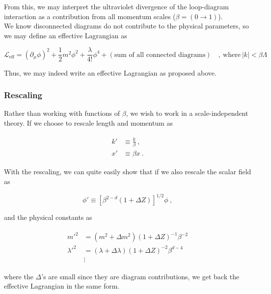 \documentclass[10pt,twoside]{report}
\begin{document}
	From this, we may interpret the ultraviolet divergence of the loop-diagram interaction as a contribution from all momentum scales ($\beta=(0\rightarrow1)$).\\
	
	We know disconnected diagrams do not contribute to the physical parameters, so we may define an effective Lagrangian as
	
	\begin{equation}
		\mathcal{L}_{\text{eff}} = \left(\partial_\mu\phi\right)^2 + \frac{1}{2}m^2\phi^2 + \frac{\lambda}{4!}\phi^4 + (\text{sum of all connected diagrams}) \quad,\:\text{where}\: |k|<\beta\Lambda
	\end{equation}
	
	Thus, we may indeed write an effective Lagrangian as proposed above.\\
	
	\subsubsection{Rescaling}
	Rather than working with functions of $\beta$, we wish to work in a scale-independent theory. If we choose to rescale length and momentum as
	
	\begin{align}
		\begin{split}
		k' &\equiv \frac{k}{\beta} \:,\\
		x' &\equiv \beta x \:.
		\end{split}
	\end{align}
	
	With the rescaling, we can quite easily show that if we also rescale the scalar field as
	
	\begin{equation}
		\phi' \equiv \left[\beta^{2-d}(1+\Delta Z)\right]^{1/2}\phi \:,
	\end{equation}
	
	\noindent and the physical constants as
	
	\begin{align}
		\begin{split}
			m'^2 &= \left(m^2 + \Delta m^2\right)(1+\Delta Z)^{-1}\beta^{-2} \\
			\lambda'^2 &= \left(\lambda + \Delta \lambda\right)(1+\Delta Z)^{-2}\beta^{d-4} \\
			&\vdots
		\end{split}
	\end{align}
	
	\noindent where the $\Delta$'s are small since they are diagram contributions, we get back the effective Lagrangian in the same form.\\
	
\end{document}
